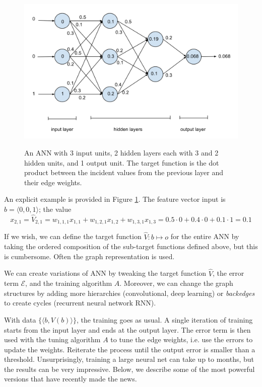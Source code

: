 \documentclass[12pt]{article}  %
\begin{document}
\begin{figure}
\centering
\includegraphics[scale=0.5]{images/ANN.png}\\
\caption{An ANN with 3 input units, 2 hidden layers each with 3 and 2 hidden units, and 1 output unit. The target function is the dot product between the incident values from the previous layer and their edge weights.}\label{ANN-fig}
\end{figure}

An explicit example is provided in Figure \ref{ANN-fig}. The feature vector input is $b = \langle 0,0,1 \rangle$; the value $$x_{2,1} = \hat{V}_{2,1} = w_{1,1,1}x_{1,1} + w_{1,2,1}x_{1,2} + w_{1,3,1}x_{1,3} = 0.5 \cdot 0 + 0.4 \cdot 0 + 0.1 \cdot 1 = 0.1$$

If we wish, we can define the target function $\hat{V} : b \mapsto o$ for the entire ANN by taking the ordered composition of the sub-target functions defined above, but this is cumbersome. Often the graph representation is used.

We can create variations of ANN by tweaking the target function $\hat{V}$, the error term $\mathcal{E}$, and the training algorithm $A$. Moreover, we can change the graph structures by adding more hierarchies (convolutional, deep learning) or {\em backedges} to create cycles (recurrent neural network RNN).

With data $\{\langle b, V(b) \rangle\}$, the training goes as usual. A single iteration of training starts from the input layer and ends at the output layer. The error term is then used with the tuning algorithm $A$ to tune the edge weights, i.e. use the errors to update the weights. Reiterate the process until the output error is smaller than a threshold. Unsurprisingly, training a large neural net can take up to months, but the results can be very impressive. Below, we describe some of the most powerful versions that have recently made the news.
\end{document}
